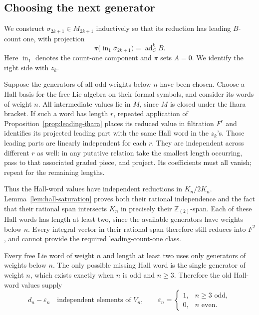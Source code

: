 \documentclass[11pt]{article}
\theoremstyle{definition}
\theoremstyle{remark}
\numberwithin{equation}{section}
\begin{document}
\subsection{Choosing the next generator}
We construct \(\sigma_{2k+1}\in M_{2k+1}\) inductively so that
its reduction has leading \(B\)-count one, with projection
\begin{equation}\label{eq:generator-leading-term}
 \pi\bigl(\operatorname{in}_1\overline\sigma_{2k+1}\bigr)
       =\operatorname{ad}_C^kB.
\end{equation}
Here \(\operatorname{in}_1\) denotes the count-one component and
\(\pi\) sets \(A=0\).  We identify the right side with \(z_k\).

Suppose the generators of all odd weights below \(n\) have been
chosen.  Choose a Hall basis for the free Lie algebra on their
formal symbols, and consider its words of weight \(n\).
All intermediate values lie in \(M\), since \(M\) is closed under
the Ihara bracket.
If such a word has length \(r\), repeated application of
Proposition~\ref{prop:leading-ihara} places its reduced value in
filtration \(F^r\) and identifies its projected leading part with
the same Hall word in the \(z_k\)'s.
Those leading parts are linearly independent for each \(r\).
They are independent across different \(r\) as well: in any
putative relation take the smallest length occurring, pass to
that associated graded piece, and project.  Its coefficients
must all vanish; repeat for the remaining lengths.

Thus the Hall-word values have independent reductions in
\(K_n/2K_n\).  Lemma~\ref{lem:hall-saturation} proves both their
rational independence and the fact that their rational span
intersects \(K_n\) in precisely their \(\mathbb Z_{(2)}\)-span.
Each of these Hall words has length at least two, since the
available generators have weights below \(n\).  Every integral
vector in their rational span therefore still reduces into
\(F^2\), and cannot provide the required leading-count-one class.

Every free Lie word of weight \(n\) and length at least two uses
only generators of weights below \(n\).  The only possible
missing Hall word is the single generator of weight \(n\), which
exists exactly when \(n\) is odd and \(n\ge3\).  Therefore the old
Hall-word values supply
\[
 d_n-\varepsilon_n
 \quad\text{independent elements of }V_n,\qquad
 \varepsilon_n=
 \begin{cases}
  1,&n\ge3\text{ odd},\\
  0,&n\text{ even}.
 \end{cases}
\]
\end{document}
